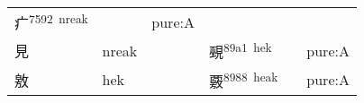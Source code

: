 \documentclass[14pt,a4paper]{scrartcl}
\begin{document}
\begin{longtable}[c]{@{}llllll@{}}
\begin{minipage}[t]{0.14\columnwidth}\raggedright\strut
疒\textsuperscript{7592~nreak}
\strut\end{minipage} &
\begin{minipage}[t]{0.14\columnwidth}\raggedright\strut
\strut\end{minipage} &
\begin{minipage}[t]{0.14\columnwidth}\raggedright\strut
pure:A
\strut\end{minipage}\tabularnewline
\begin{minipage}[t]{0.14\columnwidth}\raggedright\strut
見
\strut\end{minipage} &
\begin{minipage}[t]{0.14\columnwidth}\raggedright\strut
nreak
\strut\end{minipage} &
\begin{minipage}[t]{0.14\columnwidth}\raggedright\strut
\strut\end{minipage} &
\begin{minipage}[t]{0.14\columnwidth}\raggedright\strut
覡\textsuperscript{89a1~hek}
\strut\end{minipage} &
\begin{minipage}[t]{0.14\columnwidth}\raggedright\strut
\strut\end{minipage} &
\begin{minipage}[t]{0.14\columnwidth}\raggedright\strut
pure:A
\strut\end{minipage}\tabularnewline
\begin{minipage}[t]{0.14\columnwidth}\raggedright\strut
敫
\strut\end{minipage} &
\begin{minipage}[t]{0.14\columnwidth}\raggedright\strut
hek
\strut\end{minipage} &
\begin{minipage}[t]{0.14\columnwidth}\raggedright\strut
\strut\end{minipage} &
\begin{minipage}[t]{0.14\columnwidth}\raggedright\strut
覈\textsuperscript{8988~heak}
\strut\end{minipage} &
\begin{minipage}[t]{0.14\columnwidth}\raggedright\strut
\strut\end{minipage} &
\begin{minipage}[t]{0.14\columnwidth}\raggedright\strut
pure:A
\strut\end{minipage}\tabularnewline
\bottomrule
\end{longtable}
\end{document}
